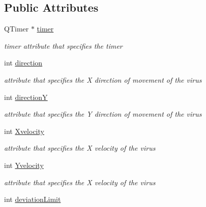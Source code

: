 \subsection*{Public Attributes}
\begin{DoxyCompactItemize}
\item 
\hypertarget{classvirus_ab7a1a248f91d2826090771212b62681f}{Q\-Timer $\ast$ \hyperlink{classvirus_ab7a1a248f91d2826090771212b62681f}{timer}}\label{classvirus_ab7a1a248f91d2826090771212b62681f}

\begin{DoxyCompactList}\small\item\em timer attribute that specifies the timer \end{DoxyCompactList}\item 
\hypertarget{classvirus_aa11b0a8ce6eb48a0342632c3a6117a4f}{int \hyperlink{classvirus_aa11b0a8ce6eb48a0342632c3a6117a4f}{direction}}\label{classvirus_aa11b0a8ce6eb48a0342632c3a6117a4f}

\begin{DoxyCompactList}\small\item\em attribute that specifies the X direction of movement of the virus \end{DoxyCompactList}\item 
\hypertarget{classvirus_a8500ee5b376d25ad355e6d44cf1a7c33}{int \hyperlink{classvirus_a8500ee5b376d25ad355e6d44cf1a7c33}{direction\-Y}}\label{classvirus_a8500ee5b376d25ad355e6d44cf1a7c33}

\begin{DoxyCompactList}\small\item\em attribute that specifies the Y direction of movement of the virus \end{DoxyCompactList}\item 
\hypertarget{classvirus_a819b31358027382d81b7490ca08e4858}{int \hyperlink{classvirus_a819b31358027382d81b7490ca08e4858}{Xvelocity}}\label{classvirus_a819b31358027382d81b7490ca08e4858}

\begin{DoxyCompactList}\small\item\em attribute that specifies the X velocity of the virus \end{DoxyCompactList}\item 
\hypertarget{classvirus_ada2944c1d4e132d5400966a50069877d}{int \hyperlink{classvirus_ada2944c1d4e132d5400966a50069877d}{Yvelocity}}\label{classvirus_ada2944c1d4e132d5400966a50069877d}

\begin{DoxyCompactList}\small\item\em attribute that specifies the X velocity of the virus \end{DoxyCompactList}\item 
\hypertarget{classvirus_a06e077e131c4aff9fa3bd319ec16729e}{int \hyperlink{classvirus_a06e077e131c4aff9fa3bd319ec16729e}{deviation\-Limit}}\label{classvirus_a06e077e131c4aff9fa3bd319ec16729e}


\end{DoxyCompactItemize}
